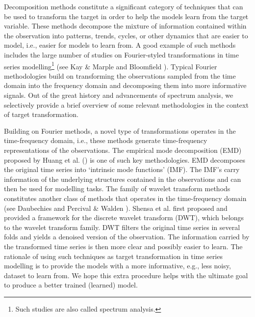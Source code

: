 Decomposition methods constitute a significant category of techniques that can be used to transform the target in order to help the models learn from the target variable. These methods decompose the mixture of information contained within the observation into patterns, trends, cycles, or other dynamics that are easier to model, i.e., easier for models to learn from. A good example of such methods includes the large number of studies on Fourier-styled transformations in time series modelling\footnote{Such studies are also called spectrum analysis.} (see Kay \& Marple \citeyear{kay1981spectrum} and Bloomfield \citeyear{bloomfield2004fourier}). Typical Fourier methodologies build on transforming the observations sampled from the time domain into the frequency domain and decomposing them into more informative signals. Out of the great history and advancements of spectrum analysis, we selectively provide a brief overview of some relevant methodologies in the context of target transformation.

Building on Fourier methods, a novel type of transformations operates in the time-frequency domain, i.e., these methods generate time-frequency representations of the observations. The empirical mode decomposition (EMD) proposed by Huang et al. (\citeyear{huang1998empirical}) is one of such key methodologies. EMD decomposes the original time series into `intrinsic mode functions' (IMF). The IMF's carry information of the underlying structures contained in the observations and can then be used for modelling tasks. The family of wavelet transform methods constitutes another class of methods that operates in the time-frequency domain (see Daubechies \citeyear{daubechies1992ten} and Percival \& Walden \citeyear{percival2000wavelet}). Shensa et al. \citeyear{shensa1992discrete} first proposed and provided a framework for the discrete wavelet transform (DWT), which belongs to the wavelet transform family. DWT filters the original time series in several folds and yields a denoised version of the observation. The information carried by the transformed time series is then more clear and possibly easier to learn. The rationale of using such techniques as target transformation in time series modelling is to provide the models with a more informative, e.g., less noisy, dataset to learn from. We hope this extra procedure helps with the ultimate goal to produce a better trained (learned) model.

